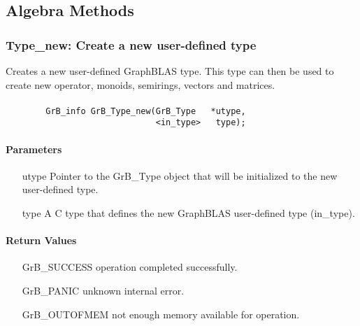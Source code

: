 \subsection{Algebra Methods}
\label{Sec:AlgebraMethods}



\subsubsection{{\sf Type\_new}: Create a new user-defined type}

Creates a new user-defined GraphBLAS type. This type can then be used to create new
operator, monoids, semirings, vectors and matrices.

\paragraph{\syntax}

\begin{verbatim}
        GrB_info GrB_Type_new(GrB_Type	 *utype,
                              <in_type>	  type);
\end{verbatim}

\paragraph{Parameters}

\begin{itemize}[leftmargin=1.1in]
	\item[{\sf utype}] 	Pointer to the {\sf GrB\_Type} object that will be initialized to the new user-defined type.
	\item[{\sf type}]	A C type that defines the new GraphBLAS user-defined type ({\sf in\_type}).
\end{itemize}

\paragraph{Return Values}

\begin{itemize}[leftmargin=2.1in]
\item[{\sf GrB\_SUCCESS}]           operation completed successfully.
\item[{\sf GrB\_PANIC}]             unknown internal error.
\item[{\sf GrB\_OUTOFMEM}]          not enough memory available for operation.
\end{itemize}

